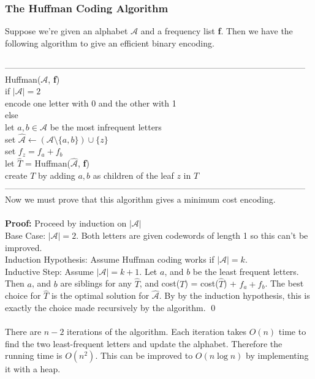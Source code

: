 \documentclass{article}
\newcommand{\tb}[1]{\textbf{#1}}
\newcommand{\proo}{\textbf{Proof: }}
\newcommand{\mcal}[1]{\mathcal{#1}}
\begin{document}
\subsubsection{The Huffman Coding Algorithm}
Suppose we're given an alphabet $\mcal{A}$ and a frequency list \tb{f}. Then we have the following algorithm to give an efficient binary encoding.\\\\
---------------------------------------------------------------------------------------------------------
Huffman($\mcal{A}$, \tb{f})\\
	\hspace*{7mm} if $|\mcal{A}| = 2$\\
	\hspace*{14mm} encode one letter with 0 and the other with 1\\
	\hspace*{7mm} else\\
	\hspace*{14mm} let $a, b \in \mcal{A}$ be the most infrequent letters\\
	\hspace*{14mm} set $\hat{\mcal{A}} \leftarrow (\mcal{A} \setminus \{a, b\})\cup \{z\}$\\
	\hspace*{14mm} set $f_z = f_a + f_b$\\
	\hspace*{14mm} let $\hat{T}$ = Huffman($\hat{\mcal{A}}$, \tb{f})\\
	\hspace*{14mm} create $T$ by adding $a, b$ as children of the leaf $z$ in $\hat{T}$\\
---------------------------------------------------------------------------------------------------------\\
Now we must prove that this algorithm gives a minimum cost encoding.\\\\
\proo Proceed by induction on $|\mcal{A}|$\\
Base Case: $|\mcal{A}| = 2$. Both letters are given codewords of length 1 so this can't be improved.\\
Induction Hypothesis: Assume Huffman coding works if $|\mcal{A}| = k$.\\
Inductive Step: Assume $|\mcal{A}| = k+1$. Let $a$, and $b$ be the least frequent letters. Then $a$, and $b$ are siblings for any $\hat{T}$, and cost($T$) = cost($\hat{T}$) + $f_a + f_b$. The best choice for $\hat{T}$ is the optimal solution for $\hat{\mcal{A}}$. By by the induction hypothesis, this is exactly the choice made recursively by the algorithm.
\qed\\\\
There are $n-2$ iterations of the algorithm. Each iteration takes $O(n)$ time to find the two least-frequent letters and update the alphabet. Therefore the running time is $O(n^2)$. This can be improved to $O(n \log n)$ by implementing it with a heap.
\end{document}
